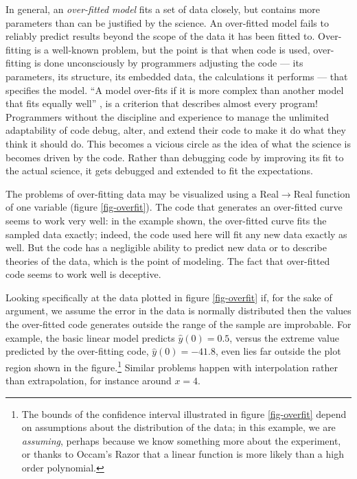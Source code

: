 In general, an \emph{over-fitted model\/} fits a set of data closely, but contains more parameters than can be justified by the science. An over-fitted model fails to reliably predict results beyond the scope of the data it has been fitted to. Over-fitting is a well-known problem, but the point is that when code is used, over-fitting is done unconsciously by programmers adjusting the code --- its parameters, its structure, its embedded data, the calculations it performs --- that specifies the model. ``A model over-fits if it is  more complex than another model that fits equally well'' \cite{over-fit}, is a criterion that describes almost every program! Programmers without the discipline and experience to manage the unlimited adaptability of code debug, alter, and extend their code to make it do what they think it should do. This becomes a vicious circle as the idea of what the science is becomes driven by the code. Rather than debugging code by improving its fit to the actual science, it gets debugged and extended to fit the expectations.  

The problems of over-fitting data may be visualized using a Real$\rightarrow$Real function of one variable (figure \ref{fig-overfit}). The code that generates an over-fitted curve seems to work very well: in the example shown, the over-fitted curve fits the sampled data exactly; indeed, the code used here will fit any new data exactly as well. But the code has a negligible ability to predict new data or to describe theories of the data, which is the point of modeling. The fact that over-fitted code seems to work well is deceptive.

Looking specifically at the data plotted in figure \ref{fig-overfit} if, for the sake of argument, we assume the error in the data is normally distributed then the values the over-fitted code generates outside the range of the sample are improbable. For example, the basic linear model predicts
$\hat{y}(0)=0.5$, 
versus the extreme value predicted by the over-fitting code, 
$\hat{y}(0)=-41.8$, 
 even lies far outside the plot region shown in the figure.\footnote{The bounds of the confidence interval illustrated in figure \ref{fig-overfit} depend on assumptions about the distribution of the data; in this example, we are \emph{assuming}, perhaps because we know something more about the experiment, or thanks to Occam's Razor that a linear function is more likely than a high order polynomial.} Similar problems happen with interpolation rather than extrapolation, for instance around $x=4$.

